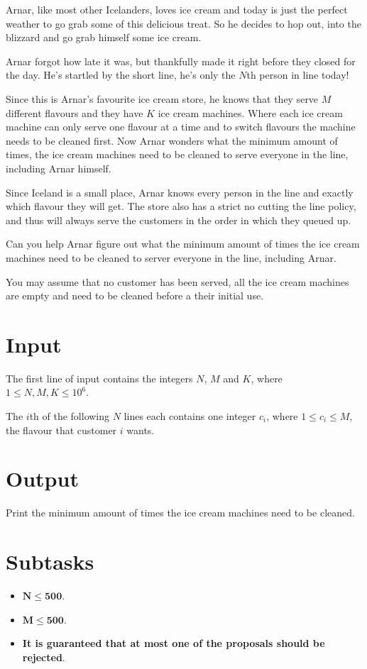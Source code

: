 Arnar, like most other Icelanders, loves ice cream and today is just the perfect
weather to go grab some of this delicious treat. So he decides to hop out, into
the blizzard and go grab himself some ice cream.

Arnar forgot how late it was, but thankfully made it right before they closed
for the day. He's startled by the short line, he's only the $N$th person in
line today!

Since this is Arnar's favourite ice cream store, he knows that they serve $M$
different flavours and they have $K$ ice cream machines.
Where each ice cream machine can only serve one flavour at a time and to switch
flavours the machine needs to be cleaned first.
Now Arnar wonders what the minimum amount of times, the ice cream machines
need to be cleaned to serve everyone in the line, including Arnar himself.

Since Iceland is a small place, Arnar knows every person in the line and exactly
which flavour they will get.
The store also has a strict no cutting the line policy, and thus will always serve
the customers in the order in which they queued up.

Can you help Arnar figure out what the minimum amount of times the ice cream
machines need to be cleaned to server everyone in the line, including Arnar.

You may assume that no customer has been served, all the ice cream machines
are empty and need to be cleaned before a their initial use.

\section*{Input}
The first line of input contains the integers $N$, $M$ and $K$, where $1 \leq
N, M, K \leq 10^6$.

The $i$th of the following $N$ lines each contains one integer $c_i$,
where $1 \leq c_i \leq M$, the flavour that customer $i$ wants.

\section*{Output}
Print the minimum amount of times the ice cream machines need to be cleaned.

\section*{Subtasks}
\begin{itemize}
    \item $\mathbf{N} \mathbf{\leq} \mathbf{500}$.
    \item $\mathbf{M} \mathbf{\leq} \mathbf{500}$.
    \item \textbf{It is guaranteed that at most one of the proposals should be
    rejected}.
\end{itemize}

